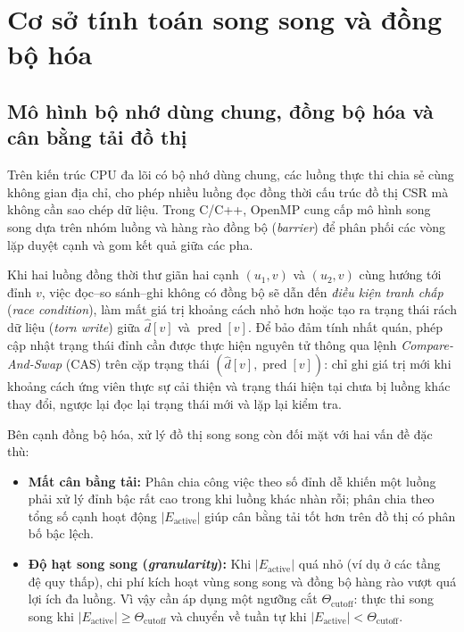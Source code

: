 \section{Cơ sở tính toán song song và đồng bộ hóa}
\label{sec:co-so-song-song}

\subsection{Mô hình bộ nhớ dùng chung, đồng bộ hóa và cân bằng tải đồ thị}

Trên kiến trúc CPU đa lõi có bộ nhớ dùng chung, các luồng thực thi chia sẻ cùng không gian địa chỉ, cho phép nhiều luồng đọc đồng thời cấu trúc đồ thị CSR mà không cần sao chép dữ liệu. Trong C/C++, OpenMP \cite{openmp52} cung cấp mô hình song song dựa trên nhóm luồng và hàng rào đồng bộ (\textit{barrier}) để phân phối các vòng lặp duyệt cạnh và gom kết quả giữa các pha.

Khi hai luồng đồng thời thư giãn hai cạnh $(u_1, v)$ và $(u_2, v)$ cùng hướng tới đỉnh $v$, việc đọc--so sánh--ghi không có đồng bộ sẽ dẫn đến \textit{điều kiện tranh chấp} (\textit{race condition}), làm mất giá trị khoảng cách nhỏ hơn hoặc tạo ra trạng thái rách dữ liệu (\textit{torn write}) giữa $\widehat{d}[v]$ và $\operatorname{pred}[v]$. Để bảo đảm tính nhất quán, phép cập nhật trạng thái đỉnh cần được thực hiện nguyên tử thông qua lệnh \textit{Compare-And-Swap} (CAS) trên cặp trạng thái $(\widehat{d}[v], \operatorname{pred}[v])$: chỉ ghi giá trị mới khi khoảng cách ứng viên thực sự cải thiện và trạng thái hiện tại chưa bị luồng khác thay đổi, ngược lại đọc lại trạng thái mới và lặp lại kiểm tra.

Bên cạnh đồng bộ hóa, xử lý đồ thị song song còn đối mặt với hai vấn đề đặc thù:
\begin{itemize}
    \item \textbf{Mất cân bằng tải:} Phân chia công việc theo số đỉnh dễ khiến một luồng phải xử lý đỉnh bậc rất cao trong khi luồng khác nhàn rỗi; phân chia theo tổng số cạnh hoạt động $|E_{\mathrm{active}}|$ giúp cân bằng tải tốt hơn trên đồ thị có phân bố bậc lệch.
    \item \textbf{Độ hạt song song (\textit{granularity}):} Khi $|E_{\mathrm{active}}|$ quá nhỏ (ví dụ ở các tầng đệ quy thấp), chi phí kích hoạt vùng song song và đồng bộ hàng rào vượt quá lợi ích đa luồng. Vì vậy cần áp dụng một ngưỡng cắt $\Theta_{\mathrm{cutoff}}$: thực thi song song khi $|E_{\mathrm{active}}| \ge \Theta_{\mathrm{cutoff}}$ và chuyển về tuần tự khi $|E_{\mathrm{active}}| < \Theta_{\mathrm{cutoff}}$.
\end{itemize}

